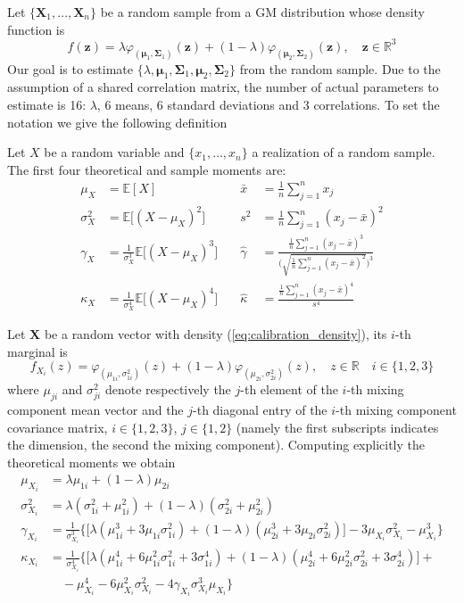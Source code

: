 Let $\{\bm{X}_1,\ldots,\bm{X}_n \}$ be a random sample from a GM distribution whose density function is 
\begin{equation}\label{eq:calibration_density}
f(\bm{z}) = \lambda \varphi_{(\bm{\mu}_1,\bm{\Sigma}_1)}(\bm{z}) + (1-\lambda)\varphi_{(\bm{\mu}_2,\bm{\Sigma}_2)}(\bm{z}),\quad \bm{z} \in \mathbb{R}^3
\end{equation}
Our goal is to estimate $\{\lambda,\bm{\mu}_1,\bm{\Sigma}_1,\bm{\mu}_2,\bm{\Sigma}_2 \}$ from the random sample. Due to the assumption of a shared correlation matrix, the number of actual parameters to estimate is 16: $\lambda$, 6 means, 6 standard deviations and 3 correlations.
To set the notation we give the following definition
\begin{definition}
	Let $X$ be a random variable and $\{x_1,\ldots,x_n\} $ a realization of a random sample. The first four theoretical and sample moments are:
	\begin{align*}
	\mu_X & = \mathbb{E}[X] \quad & \bar{x} &= \frac{1}{n}\sum_{j=1}^{n}x_j\\
	\sigma^2_X & = \mathbb{E}\big[(X-\mu_X)^2\big] \quad & s^2 &= \frac{1}{n}\sum_{j=1}^{n}(x_j-\bar{x})^2\\
	\gamma_X & = \frac{1}{\sigma_X^3}\mathbb{E}\big[(X-\mu_X)^3\big] \quad & \widehat{\gamma} & = \frac{\frac{1}{n}\sum_{j=1}^{n}(x_j-\bar{x})^3}{\Big(\sqrt{\frac{1}{n}\sum_{j=1}^{n}(x_j-\bar{x})^2} \Big)^3}\\
	\kappa_X & = \frac{1}{\sigma_X^4}\mathbb{E}\big[ (X-\mu_X)^4\big] \quad & \widehat{\kappa}&= \frac{\frac{1}{n}\sum_{j=1}^{n}(x_j-\bar{x})^4}{s^4}
	\end{align*}
\end{definition}
Let $\bm{X}$ be a random vector with density (\ref{eq:calibration_density}), its $i$-th marginal is \[f_{X_i}(z) = \varphi_{(\mu_{1i},\sigma^2_{1i})}(z)+(1-\lambda)\varphi_{(\mu_{2i},\sigma^2_{2i})}(z), \quad z \in \mathbb{R} \quad  i \in \{1,2,3\} \]
where $\mu_{ji}$ and $\sigma^2_{ji}$ denote respectively the $j$-th element of the $i$-th mixing component mean vector  and the $j$-th diagonal entry of the $i$-th mixing component covariance matrix, $i \in \{1,2,3\}$, $j \in \{1,2\}$ (namely the first subscripts indicates the dimension, the second the mixing component). Computing explicitly the theoretical moments we obtain
\begin{align*}
\mu_{X_i} & = \lambda\mu_{1i}+(1-\lambda)\mu_{2i}\\[15pt] 
\sigma^2_{X_i} & = \lambda(\sigma^2_{1i}+\mu^2_{1i})+(1-\lambda)(\sigma^2_{2i}+\mu^2_{2i})\\[15pt]
\gamma_{X_i} & = \frac{1}{\sigma^3_{X_i}}\Big\{\big[\lambda(\mu^3_{1i}+3\mu_{1i}\sigma^2_{1i}) + (1-\lambda)(\mu^3_{2i}+3\mu_{2i}\sigma^2_{2i})\big] -3\mu_{X_i}\sigma^2_{X_i}-\mu^3_{X_i} \Big\}\\[15pt]
\kappa_{X_i}&= \frac{1}{\sigma^4_{X_i}}\Big\{\big[\lambda(\mu^4_{1i}+6\mu^2_{1i}\sigma^2_{1i}+3\sigma^4_{1i})+(1-\lambda)(\mu^4_{2i}+6\mu^2_{2i}\sigma^2_{2i}+3\sigma^4_{2i}) \big] +\\
& \quad -\mu^4_{X_i} -6\mu^2_{X_i}\sigma^2_{X_i}-4\gamma_{X_i}\sigma^3_{X_i}\mu_{X_i} \Big\}
\end{align*}
